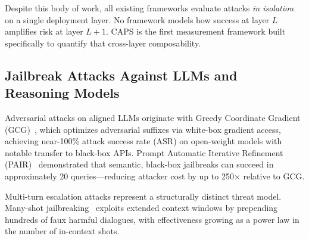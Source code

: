 Despite this body of work, all existing frameworks evaluate attacks
\emph{in isolation} on a single deployment layer. No framework models how
success at layer $L$ amplifies risk at layer $L+1$. CAPS is the first
measurement framework built specifically to quantify that cross-layer
composability.


\subsection{Jailbreak Attacks Against LLMs and Reasoning Models}

Adversarial attacks on aligned LLMs originate with Greedy Coordinate Gradient
(GCG)~\cite{zou2023gcg}, which optimizes adversarial suffixes via white-box
gradient access, achieving near-100\% attack success rate (ASR) on open-weight
models with notable transfer to black-box APIs. Prompt Automatic Iterative
Refinement (PAIR)~\cite{chao2023pair} demonstrated that semantic, black-box
jailbreaks can succeed in approximately 20 queries---reducing attacker cost by
up to 250$\times$ relative to GCG. 

Multi-turn escalation attacks represent a structurally distinct threat model.
Many-shot jailbreaking~\cite{anil2024manyshot} exploits extended context
windows by prepending hundreds of faux harmful dialogues, with effectiveness
growing as a power law in the number of in-context shots.

